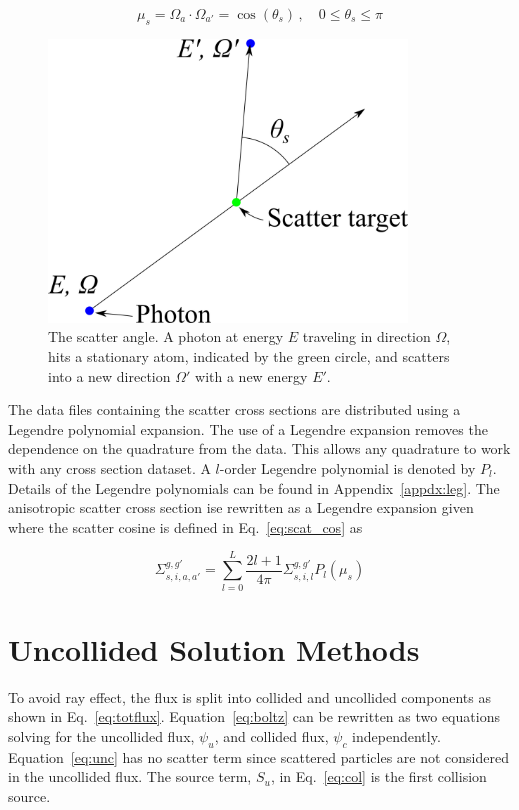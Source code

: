 \begin{equation} \label{eq:scat_cos}
\mu_s = \Omega_a \cdot \Omega_{a'} = \cos(\theta_s) \,, \quad 0 \leq \theta_s \leq \pi
\end{equation}

\begin{figure}[tb]
  \begin{center}
   \includegraphics[width=3.75in]{figs/scat_ang}
  \end{center}
  \caption{The scatter angle. A photon at energy $E$ traveling in direction $\Omega$, hits a stationary atom, indicated by the green circle, and scatters into a new direction $\Omega'$ with a new energy $E'$.}
\label{fig:scat_ang}
\end{figure}%

The data files containing the scatter cross sections are distributed using a Legendre polynomial expansion. The use of a Legendre expansion removes the dependence on the quadrature from the data. This allows any quadrature to work with any cross section dataset. A $l$-order Legendre polynomial is denoted by $P_l$. Details of the Legendre polynomials can be found in Appendix~\ref{appdx:leg}. The anisotropic scatter cross section ise rewritten as a Legendre expansion given where the scatter cosine is defined in Eq.~\ref{eq:scat_cos} as

\begin{equation} \label{eq:leg_1}
\Sigma_{s, i, a, a'}^{g, g'} = \sum_{l=0}^L \frac{2l+1}{4 \pi}\Sigma_{s, i, l}^{g, g'} P_l(\mu_s)
\end{equation}



\section{Uncollided Solution Methods}\label{sec:uncol}
To avoid ray effect, the flux is split into collided and uncollided components as shown in Eq.~\ref{eq:totflux}. Equation~\ref{eq:boltz} can be rewritten as two equations solving for the uncollided flux, $\psi_u$, and collided flux, $\psi_c$ independently. Equation~\ref{eq:unc} has no scatter term since scattered particles are not considered in the uncollided flux. The source term, $S_u$, in Eq.~\ref{eq:col} is the first collision source.


